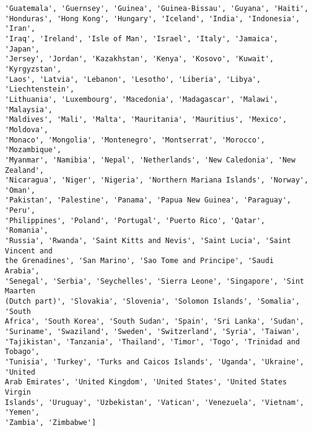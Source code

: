 \documentclass[11pt]{article}
\begin{document}
\begin{Verbatim}[commandchars=\\\{\}]
'Guatemala', 'Guernsey', 'Guinea', 'Guinea-Bissau', 'Guyana', 'Haiti',
'Honduras', 'Hong Kong', 'Hungary', 'Iceland', 'India', 'Indonesia', 'Iran',
'Iraq', 'Ireland', 'Isle of Man', 'Israel', 'Italy', 'Jamaica', 'Japan',
'Jersey', 'Jordan', 'Kazakhstan', 'Kenya', 'Kosovo', 'Kuwait', 'Kyrgyzstan',
'Laos', 'Latvia', 'Lebanon', 'Lesotho', 'Liberia', 'Libya', 'Liechtenstein',
'Lithuania', 'Luxembourg', 'Macedonia', 'Madagascar', 'Malawi', 'Malaysia',
'Maldives', 'Mali', 'Malta', 'Mauritania', 'Mauritius', 'Mexico', 'Moldova',
'Monaco', 'Mongolia', 'Montenegro', 'Montserrat', 'Morocco', 'Mozambique',
'Myanmar', 'Namibia', 'Nepal', 'Netherlands', 'New Caledonia', 'New Zealand',
'Nicaragua', 'Niger', 'Nigeria', 'Northern Mariana Islands', 'Norway', 'Oman',
'Pakistan', 'Palestine', 'Panama', 'Papua New Guinea', 'Paraguay', 'Peru',
'Philippines', 'Poland', 'Portugal', 'Puerto Rico', 'Qatar', 'Romania',
'Russia', 'Rwanda', 'Saint Kitts and Nevis', 'Saint Lucia', 'Saint Vincent and
the Grenadines', 'San Marino', 'Sao Tome and Principe', 'Saudi Arabia',
'Senegal', 'Serbia', 'Seychelles', 'Sierra Leone', 'Singapore', 'Sint Maarten
(Dutch part)', 'Slovakia', 'Slovenia', 'Solomon Islands', 'Somalia', 'South
Africa', 'South Korea', 'South Sudan', 'Spain', 'Sri Lanka', 'Sudan',
'Suriname', 'Swaziland', 'Sweden', 'Switzerland', 'Syria', 'Taiwan',
'Tajikistan', 'Tanzania', 'Thailand', 'Timor', 'Togo', 'Trinidad and Tobago',
'Tunisia', 'Turkey', 'Turks and Caicos Islands', 'Uganda', 'Ukraine', 'United
Arab Emirates', 'United Kingdom', 'United States', 'United States Virgin
Islands', 'Uruguay', 'Uzbekistan', 'Vatican', 'Venezuela', 'Vietnam', 'Yemen',
'Zambia', 'Zimbabwe']
    \end{Verbatim}
\end{document}
